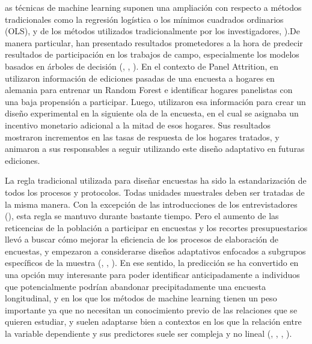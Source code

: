 as técnicas de machine learning suponen una ampliación con respecto a métodos tradicionales como la regresión logística o los mínimos cuadrados ordinarios (OLS), y  de los métodos utilizados tradicionalmente por los investigadores, \cite{kern2019tree}).De manera particular, han presentado resultados prometedores a la hora de predecir resultados de participación en los trabajos de campo, especialmente los modelos basados en árboles de decisión (\cite{kern2019tree}, \cite{kern2021predicting}, \cite{liu2020using}). En el contexto de Panel Attrition, en \cite{beste2023case} utilizaron información de ediciones pasadas de una encuesta a hogares en alemania para entrenar un Random Forest e identificar hogares panelistas con una baja propensión a participar. Luego, utilizaron esa información para crear un diseño experimental en la siguiente ola de la encuesta, en el cual se asignaba un incentivo monetario adicional a la mitad de esos hogares. Sus resultados mostraron incrementos en las tasas de respuesta de los hogares tratados, y animaron a sus responsables a seguir utilizando este diseño adaptativo en futuras ediciones.


La regla tradicional utilizada para diseñar encuestas ha sido la estandarización de todos los procesos y protocolos. Todas unidades muestrales deben ser tratadas de la misma manera. Con la excepción de las introducciones de los entrevistadores (\cite{groves1992understanding}), esta regla se mantuvo durante bastante tiempo. Pero el aumento de las reticencias de la población a participar en encuestas y los recortes presupuestarios llevó a buscar cómo mejorar la eficiencia de los procesos de elaboración de encuestas, y empezaron a considerarse diseños adaptativos enfocados a subgrupos específicos de la muestra (\cite{groves2006responsive}, \cite{lynn2014targeted}, \cite{lynn2017standardised}). En ese sentido, la predicción se ha convertido en una opción muy interesante para poder identificar anticipadamente a individuos que potencialmente podrían abandonar precipitadamente una encuesta longitudinal, y en los que los métodos de machine learning tienen un peso importante ya que no necesitan un conocimiento previo de las relaciones que se quieren estudiar, y suelen adaptarse bien a contextos en los que la relación entre la variable dependiente y sus predictores suele ser compleja y no lineal (\cite{buskirk2018introduction}, \cite{kern2019tree}, \cite{kern2021predicting}, \cite{jankowsky2022validation}).

